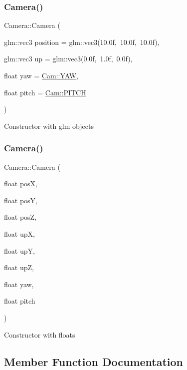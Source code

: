 \subsubsection{\texorpdfstring{Camera()}{Camera()}\hspace{0.1cm}{\footnotesize\ttfamily [1/2]}}
{\footnotesize\ttfamily Camera\+::\+Camera (\begin{DoxyParamCaption}\item[{glm\+::vec3}]{position = {\ttfamily glm\+:\+:vec3(10.0f,~10.0f,~10.0f)},  }\item[{glm\+::vec3}]{up = {\ttfamily glm\+:\+:vec3(0.0f,~1.0f,~0.0f)},  }\item[{float}]{yaw = {\ttfamily \hyperlink{namespaceCam_a19ee86132ca8219870515f550db61f93}{Cam\+::\+Y\+AW}},  }\item[{float}]{pitch = {\ttfamily \hyperlink{namespaceCam_a5ba61b0ad0aa42c7887436a7f0ac5628}{Cam\+::\+P\+I\+T\+CH}} }\end{DoxyParamCaption})}

Constructor with glm objects \mbox{\label{classCamera_a3537fd723fdfb5fed73a084346270cf6}} 
\subsubsection{\texorpdfstring{Camera()}{Camera()}\hspace{0.1cm}{\footnotesize\ttfamily [2/2]}}
{\footnotesize\ttfamily Camera\+::\+Camera (\begin{DoxyParamCaption}\item[{float}]{posX,  }\item[{float}]{posY,  }\item[{float}]{posZ,  }\item[{float}]{upX,  }\item[{float}]{upY,  }\item[{float}]{upZ,  }\item[{float}]{yaw,  }\item[{float}]{pitch }\end{DoxyParamCaption})}

Constructor with floats 

\subsection{Member Function Documentation}
\mbox{\label{classCamera_afedb32db9693443411c939438f50b565}} 
